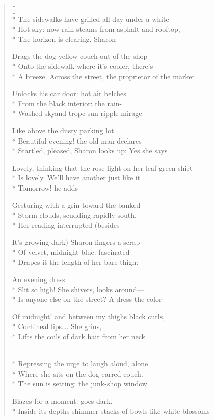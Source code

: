 \label{ch:sunset_on_market_street}
\settowidth{\versewidth}{Inside its depths shimmer stacks of bowls like white blossoms}
\begin{verse}[\versewidth]
\\*
The sidewalks have grilled all day under a white-\\*
Hot sky: now rain steams from asphalt and rooftop,\\*
The horizon is clearing.           Sharon

Drags the dog-yellow couch out of the shop\\*
Onto the sidewalk where it's cooler, there's\\*
A breeze.     Across the street, the proprietor of the market

Unlocks his car door: hot air belches\\*
From the black interior: the rain-\\*
Washed skyand tropc sun ripple mirage-

Like above the dusty parking lot.\\*
Beautiful evening! the old man declares---\\*
Startled, pleased, Sharon looks up: Yes she says

Lovely,  thinking that the rose light on her leaf-green shirt\\*
Is lovely. We'll have another just like it\\*
Tomorrow!  he adds

Gesturing with a grin toward the banked\\*
Storm clouds, scudding rapidly south.\\*
Her reading interrupted     (besides

It's growing dark)     Sharon fingers a scrap\\*
Of velvet, midnight-blue:     fascinated\\*
Drapes it the length of her bare thigh:

An evening dress\\*
Slit so high!   She shivers, looks around---\\*
Is anyone else on the street?     A dress the color

Of midnight!  and between my thighs black curls,\\*
Cochineal lips\ldots . She grins,\\*
Lifts the coils of dark hair from her neck

\\*
Repressing the urge to laugh aloud, alone\\*
Where she sits on the dog-earred couch.\\*
The sun is setting: the junk-shop window

Blazes for a moment: goes dark.\\*
Inside its depths shimmer stacks of bowls like white blossoms
\end{verse}
